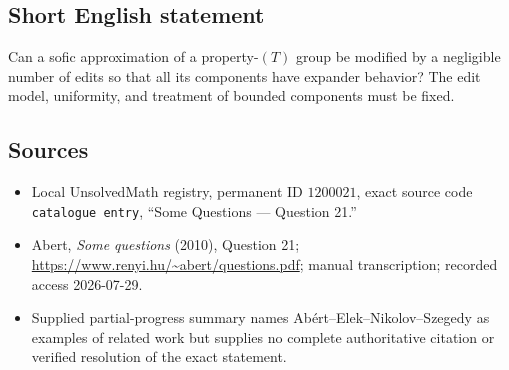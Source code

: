 \documentclass[11pt]{article}
\begin{document}
\subsection{Short English statement}
Can a sofic approximation of a property-\((T)\) group be modified by a negligible number of edits so that all its components have expander behavior? The edit model, uniformity, and treatment of bounded components must be fixed.
\subsection{Sources}
\begin{itemize}
\item Local UnsolvedMath registry, permanent ID \(1200021\), exact source code \texttt{catalogue entry}, ``Some Questions --- Question 21.''
\item Abert, \emph{Some questions} (2010), Question 21; \url{https://www.renyi.hu/~abert/questions.pdf}; manual transcription; recorded access 2026-07-29.
\item Supplied partial-progress summary names Ab\'ert--Elek--Nikolov--Szegedy as examples of related work but supplies no complete authoritative citation or verified resolution of the exact statement.
\end{itemize}
\end{document}
